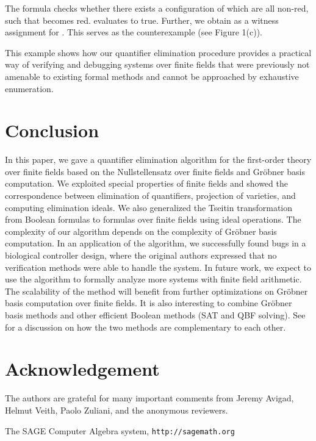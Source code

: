 \documentclass[envcountsect]{llncs}
\begin{document}
{{{}The formula checks whether there exists a configuration of  which are all non-red, such that  becomes red.  evaluates to true. Further, we obtain  as a witness assignment for . This serves as the counterexample (see Figure 1(c)). 

This example shows how our quantifier elimination procedure provides a practical way of verifying and debugging systems over finite fields that were previously not amenable to existing formal methods and cannot be approached by exhaustive enumeration.

\section{Conclusion}
In this paper, we gave a quantifier elimination algorithm for the first-order theory over finite fields based on the Nullstellensatz over finite fields and Gr\"obner basis computation. We exploited special properties of finite fields and showed the correspondence between elimination of quantifiers, projection of varieties, and computing elimination ideals. We also generalized the Tseitin transformation from Boolean formulas to formulas over finite fields using ideal operations. The complexity of our algorithm depends on the complexity of Gr\"obner basis computation. In an application of the algorithm, we successfully found bugs in a biological controller design, where the original authors expressed that no verification methods were able to handle the system. In future work, we expect to use the algorithm to formally analyze more systems with finite field arithmetic. The scalability of the method will benefit from further optimizations on Gr\"obner basis computation over finite fields. It is also interesting to combine Gr\"obner basis methods and other efficient Boolean methods (SAT and QBF solving). See \cite{gao09} for a discussion on how the two methods are complementary to each other.

\section*{Acknowledgement}

The authors are grateful for many important comments from Jeremy Avigad, Helmut Veith, Paolo Zuliani, and the anonymous reviewers. 

\begin{thebibliography}{20}

 The SAGE Computer Algebra system, {\tt http://sagemath.org}


\end{thebibliography}}}
\end{document}
